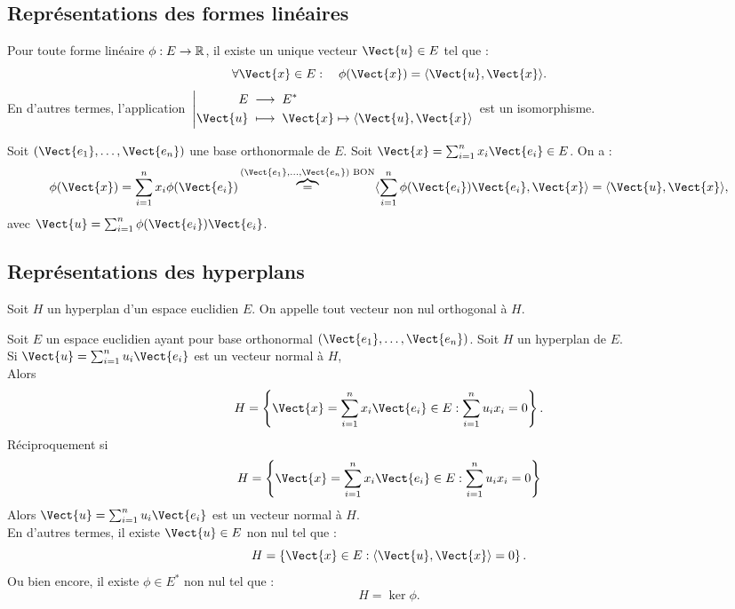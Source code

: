 \documentclass{book}
\begin{document}
\subsection{Représentations des formes linéaires}

\begin{Proposition}
Pour toute forme linéaire $\phi : E \to \mathbb{R}$, il existe un unique vecteur $\Vect{u} \in E$ tel que :
$$ \forall \Vect{x} \in E:\quad  \phi(\Vect{x}) =\PS{ \Vect{u}}{ \Vect{x}} .$$
En d'autres termes, l'application $\Fonction{}{E}{E^*}{\Vect{u}}{\Vect{x} \mapsto \PS{ \Vect{u}}{ \Vect{x}}} $
est un isomorphisme.
\end{Proposition}
\begin{Demonstration}
 Soit $(\Vect{e_1},\dots,\Vect{e_n})$ une base orthonormale de $E$. 
Soit $\Vect{x}=\sum_{i=1}^n x_i \Vect{e_i}  \in E$. 
 On a :
$$ \phi(\Vect{x})=\sum_{i=1}^n x_i \phi(\Vect{e_i})\overbrace{=}^{(\Vect{e_1},\dots,\Vect{e_n})\text{ BON}}\PS{\sum_{i=1}^n \phi(\Vect{e_i})\Vect{e_i} }{\Vect{x}}=\PS{\Vect{u} }{\Vect{x}},$$ 
avec $ \Vect{u}=\sum_{i=1}^n \phi(\Vect{e_i})\Vect{e_i}$.
\end{Demonstration}


\subsection{Représentations des hyperplans}
\begin{Definition}
Soit $H$ un hyperplan d'un espace euclidien $ E$. On appelle  tout vecteur non nul orthogonal à $ H$.
\end{Definition}


\begin{Proposition}
 Soit $ E$ un espace euclidien ayant pour base orthonormal $(\Vect{e_1},\dots,\Vect{e_n})$.
Soit $H$ un hyperplan de $E$. \\
Si $\Vect{u}=\sum_{i=1}^n u_i \Vect{e_i}$ est un vecteur normal à $H$,\\
Alors 
$$H=\left\{\Vect{x}=\sum_{i=1}^n x_i \Vect{e_i} \in E:   \sum_{i=1}^n u_i x_i=0 \right\}.$$
Réciproquement si 
$$H=\left\{\Vect{x}=\sum_{i=1}^n x_i \Vect{e_i} \in E:   \sum_{i=1}^n u_i x_i=0 \right\}$$
Alors  $\Vect{u}=\sum_{i=1}^n u_i \Vect{e_i}$ est un vecteur normal à $H$.\\
En d'autres termes, il existe  $\Vect{u}\in E$ non nul tel que  :
$$H=\left\{\Vect{x}\in E:   \PS{\Vect{u}}{\Vect{x}}=0 \right\}.$$
Ou bien encore, il existe $\phi \in E^*$ non nul tel que :
$$H=\ker \phi.$$ 
\end{Proposition}


\end{document}

